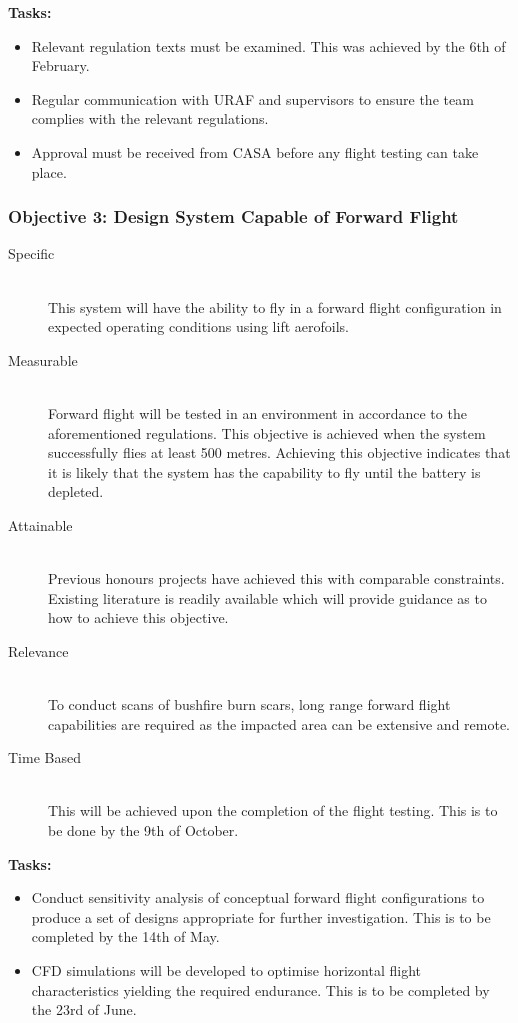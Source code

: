 \begin{appendices}
\textbf{Tasks:}
\begin{itemize}
    \item Relevant regulation texts must be examined. This was achieved by the 6th of February.
    \item Regular communication with URAF and supervisors to ensure the team complies with the relevant regulations.
    \item Approval must be received from CASA before any flight testing can take place.
\end{itemize}

\subsubsection{Objective 3: Design System Capable of Forward Flight}

\begin{description}
    \item[Specific] \hfill \\
    This system will have the ability to fly in a forward flight configuration in expected operating conditions using lift aerofoils.
    \item[Measurable] \hfill \\
    Forward flight will be tested in an environment in accordance to the aforementioned regulations. This objective is achieved when the system successfully flies at least 500 metres. Achieving this objective indicates that it is likely that the system has the capability to fly until the battery is depleted.
    \item[Attainable] \hfill \\
    Previous honours projects have achieved this with comparable constraints. Existing literature is readily available which will provide guidance as to how to achieve this objective.
    \item[Relevance] \hfill \\
    To conduct scans of bushfire burn scars, long range forward flight capabilities are required as the impacted area can be extensive and remote.
    \item[Time Based] \hfill \\
    This will be achieved upon the completion of the flight testing. This is to be done by the 9th of October.
\end{description}

\textbf{Tasks:}
\begin{itemize}
    \item Conduct sensitivity analysis of conceptual forward flight configurations to produce a set of designs appropriate for further investigation. This is to be completed by the 14th of May.
    \item CFD simulations will be developed to optimise horizontal flight characteristics yielding the required endurance. This is to be completed by the 23rd of June.
\end{itemize}



\end{appendices}

